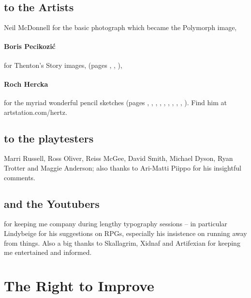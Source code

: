 \begin{multicols}{2}

\subsection*{to the Artists}

Neil McDonnell for the basic photograph which became the Polymorph image,

\paragraph{Boris Pecikozi\'c} for Thenton's Story images, (pages 
\pageref{boris:jump}, 
\pageref{boris:brawl}, 
\pageref{boris:meet}), 


\paragraph{Roch Hercka} for the myriad wonderful pencil sketches (pages 
\pageref{roch:races}, 
\pageref{roch:dwarf}, 
\pageref{roch:stances}, 
\pageref{roch:vitals}, 
\pageref{roch:xp1}, 
\pageref{roch:xp2}, 
\pageref{roch:enchanter}, 
\pageref{roch:polymorph}, 
\pageref{roch:runes}, 
\pageref{roch:light}
).
Find him at artstation.com/hertz.

\subsection*{to the playtesters} Marri Russell, Ross Oliver, Reiss McGee, David Smith, Michael Dyson, Ryan Trotter and Maggie Anderson; also thanks to Ari-Matti Piippo for his insightful comments.

\subsection*{and the Youtubers} for keeping me company during lengthy typography sessions -- in particular Lindybeige for his suggestions on RPGs, especially his insistence on running away from things.
Also a big thanks to Skallagrim, Xidnaf and Artifexian for keeping me entertained and informed.

\end{multicols}

\section*{The Right to Improve}

